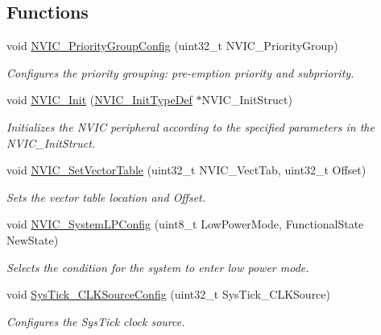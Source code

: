 \subsection*{Functions}
\begin{DoxyCompactItemize}
\item 
void \hyperlink{group___m_i_s_c_gadfb1f34f803ce54c976643db8c484442}{N\+V\+I\+C\+\_\+\+Priority\+Group\+Config} (uint32\+\_\+t N\+V\+I\+C\+\_\+\+Priority\+Group)
\begin{DoxyCompactList}\small\item\em Configures the priority grouping\+: pre-\/emption priority and subpriority. \end{DoxyCompactList}\item 
void \hyperlink{group___m_i_s_c_ga4ab373ed0870c06fca5eb51d639adf41}{N\+V\+I\+C\+\_\+\+Init} (\hyperlink{struct_n_v_i_c___init_type_def}{N\+V\+I\+C\+\_\+\+Init\+Type\+Def} $\ast$N\+V\+I\+C\+\_\+\+Init\+Struct)
\begin{DoxyCompactList}\small\item\em Initializes the N\+V\+IC peripheral according to the specified parameters in the N\+V\+I\+C\+\_\+\+Init\+Struct. \end{DoxyCompactList}\item 
void \hyperlink{group___m_i_s_c_ga1145208ad70edfc2fab19b8b8ef1b1a1}{N\+V\+I\+C\+\_\+\+Set\+Vector\+Table} (uint32\+\_\+t N\+V\+I\+C\+\_\+\+Vect\+Tab, uint32\+\_\+t Offset)
\begin{DoxyCompactList}\small\item\em Sets the vector table location and Offset. \end{DoxyCompactList}\item 
void \hyperlink{group___m_i_s_c_gae21011c5232f5b8f366acbecd12a1d4a}{N\+V\+I\+C\+\_\+\+System\+L\+P\+Config} (uint8\+\_\+t Low\+Power\+Mode, Functional\+State New\+State)
\begin{DoxyCompactList}\small\item\em Selects the condition for the system to enter low power mode. \end{DoxyCompactList}\item 
void \hyperlink{group___m_i_s_c_ga2777d255bb06ad62bb6372a9db1ff385}{Sys\+Tick\+\_\+\+C\+L\+K\+Source\+Config} (uint32\+\_\+t Sys\+Tick\+\_\+\+C\+L\+K\+Source)
\begin{DoxyCompactList}\small\item\em Configures the Sys\+Tick clock source. \end{DoxyCompactList}\end{DoxyCompactItemize}


